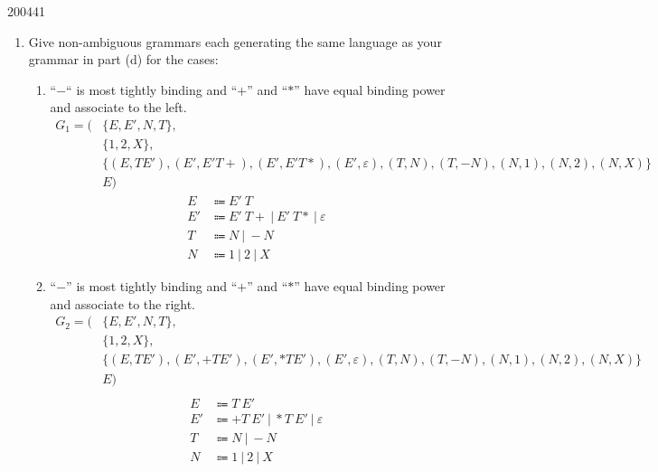 \documentclass[10pt,\jkfside,a4paper]{article}
\begin{document}
\begin{examquestion}{2004}{4}{1}
\begin{enumerate}
\item Give non-ambiguous grammars each generating the same language as your
grammar in part (d) for the cases:

\begin{enumerate}

\item ``$-$`` is most tightly binding and ``$+$'' and ``$*$'' have equal
binding power and associate to the left.
\[
\begin{split}
G_1 = (&\{E, E', N, T\}, \\
	   &\{1, 2, X\}, \\
	   &\{(E, TE'), (E', E'T+), (E', E'T*), (E', \varepsilon), (T, N), (T,
	   -N), (N, 1), (N, 2), (N, X)\} \\
	   &E)
\end{split}
\]
\begin{align*}
E  &\Coloneqq E' \ T \\
E' &\Coloneqq E' \ T+ \ | \ E' \ T* \ | \ \varepsilon \\
T  &\Coloneqq N \ | \ -N \\
N  &\Coloneqq 1 \ | \ 2 \ | \ X
\end{align*}

\item ``$-$'' is most tightly binding and ``$+$'' and ``$*$'' have equal
binding power and associate to the right.
\[
\begin{split}
G_2 = (&\{E, E', N, T\}, \\
	   &\{1, 2, X\}, \\
	   &\{(E, TE'), (E', +TE'), (E', *TE'), (E', \varepsilon), (T, N), (T,
	   -N), (N, 1), (N, 2), (N, X)\} \\
	   &E) \\
\end{split}
\]
\begin{align*}
E  &\Coloneqq T \ E' \\
E' &\Coloneqq +T \ E' \ | \ *T \ E' \ | \ \varepsilon \\
T  &\Coloneqq N \ | \ -N \\
N  &\Coloneqq 1 \ | \ 2 \ | \ X
\end{align*}


\end{enumerate}
\end{enumerate}
\end{examquestion}
\end{document}
